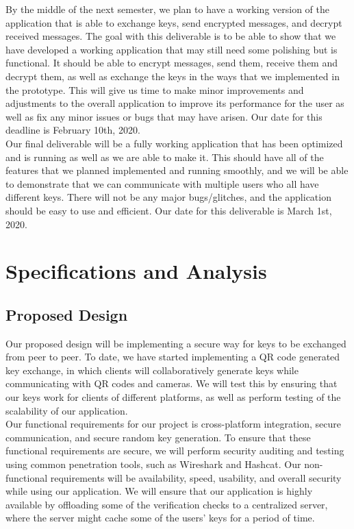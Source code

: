 \documentclass[11pt]{article}
\begin{document}
By the middle of the next semester, we plan to have a working version of the application that is able to exchange keys, send encrypted messages, and decrypt received messages. The goal with this deliverable is to be able to show that we have developed a working application that may still need some polishing but is functional. It should be able to encrypt messages, send them, receive them and decrypt them, as well as exchange the keys in the ways that we implemented in the prototype. This will give us time to make minor improvements and adjustments to the overall application to improve its performance for the user as well as fix any minor issues or bugs that may have arisen. Our date for this deadline is February 10th, 2020.\\

Our final deliverable will be a fully working application that has been optimized and is running as well as we are able to make it. This should have all of the features that we planned implemented and running smoothly, and we will be able to demonstrate that we can communicate with multiple users who all have different keys. There will not be any major bugs/glitches, and the application should be easy to use and efficient. Our date for this deliverable is March 1st, 2020.



\newpage
\section{Specifications and Analysis}
\subsection{Proposed Design}
Our proposed design will be implementing a secure way for keys to be exchanged from peer to peer. To date, we have started implementing a QR code generated key exchange, in which clients will collaboratively generate keys while communicating with QR codes and cameras. We will test this by ensuring that our keys work for clients of different platforms, as well as perform testing of the scalability of our application.\\

    Our functional requirements for our project is cross-platform integration, secure communication, and secure random key generation. To ensure that these functional requirements are secure, we will perform security auditing and testing using common penetration tools, such as Wireshark and Hashcat. Our non-functional requirements will be availability, speed, usability, and overall security while using our application. We will ensure that our application is highly available by offloading some of the verification checks to a centralized server, where the server might cache some of the users’ keys for a period of time. \\
 
\end{document}
